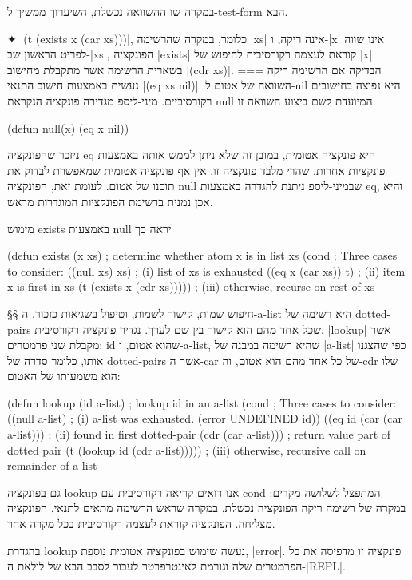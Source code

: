 במקרה שו ההשוואה נכשלת, השיערוך ממשיך ל-test-form הבא.

✦ \T|(t (exists x (car xs)))|, כלומר, במקרה שהרשימה \T|xs| אינה ריקה, ו-\T|x|
אינו שווה לפריט הראשון שב-\T|xs|, הפונקציה \T|exists| קוראת לעצמה רקורסיבית
לחיפוש של \T|x| בשארית הרשימה אשר מתקבלת מחישוב \T|(cdr xs)|.
===
הבדיקה אם הרשימה ריקה נעשית באמצעות חישוב התנאי \T|(eq xs nil)|. השוואה של אטום
ל-nil היא נפוצה בחישובים רקורסיביים. מיני-ליספ מגדירה פונקציה הנקראת null
המיועדת לשם ביצוע השוואה זו:
\begin{LIBRARY}
(defun null(x) (eq x nil))
\end{LIBRARY}

ניזכר שהפונקציה eq היא פונקציה אטומית, במובן זה שלא ניתן לממש אותה באמצעות
פונקציות אחרות, שהרי מלבד פונקציה זו, אין אף פונקציה אטומית שמאפשרת לבדוק את
תוכנו של אטום. לעומת זאת, הפונקציה null שבמיני-ליספ ניתנת להגדרה
באמצעות eq, והיא אכן נמנית ברשימת הפונקציות המוגדרות מראש.

מימוש exists באמצעות null יראה כך
\begin{KERNEL}
(defun exists (x xs) ; determine whether atom x is in list xs
  (cond ; Three cases to consider:
    ((null xs) xs) ; (i) list of xs is exhausted
    ((eq x (car xs)) t) ; (ii) item x is first in xs
    (t (exists x (cdr xs))))) ; (iii) otherwise, recurse on rest of xs
\end{KERNEL}

§§ חיפוש שמות, קישור לשמות, וטיפול בשגיאות
כזכור, ה-a-list היא רשימה של dotted-pairs שכל אחד מהם הוא קישור בין שם לערך.
נגדיר פונקציה רקורסיבית, \E|lookup| אשר מקבלת שני פרמטרים: id שהוא אטום,
ו-a-list, שהיא רשימה במבנה של \E|a-list| כפי שהצגנו אותו, כלומר סדרה של
dotted-pairs אשר ה-car של כל אחד מהם הוא אטום, וה-cdr שלו הוא משמעותו של האטום:
\begin{KERNEL}
(defun lookup (id a-list) ; lookup id in an a-list
  (cond ; Three cases to consider:
    ((null a-list) ; (i) a-list was exhausted.
      (error UNDEFINED id))
    ((eq id (car (car a-list))) ; (ii) found in first dotted-pair
      (cdr (car a-list))) ; return value part of dotted pair
    (t (lookup id (cdr a-list))))) ; (iii) otherwise, recursive call on remainder of a-list
\end{KERNEL}
גם בפונקציה lookup אנו רואים קריאה רקורסיבית עם cond המתפצל לשלושה מקרים: במקרה
של רשימה ריקה הפונקציה נכשלת, במקרה שראש הרשימה מתאים לתנאי, הפונקציה מצליחה.
הפונקציה קוראת לעצמה רקורסיבית בכל מקרה אחר.

בהגדרת lookup נעשה שימוש בפונקציה אטומית נוספת, \E|error|. פונקציה זו
מדפיסה את כל הפרמטרים שלה וגורמת לאינטרפרטר לעבור לסבב הבא של לולאת ה-\E|REPL|.

